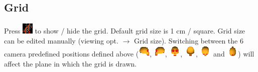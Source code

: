 \subsection{Grid}
Press \includegraphics[scale=0.7]{images/06/display/grid.png} to show / hide the grid. Default grid size is 1 cm / square. Grid size can be edited manually
(viewing opt. $\rightarrow$ Grid size).
Switching between the 6 camera predefined positions defined above (\includegraphics[scale=0.7]{images/06/camera/camera_right.png}, 
\includegraphics[scale=0.7]{images/06/camera/camera_left.png}, 
\includegraphics[scale=0.7]{images/06/camera/camera_front.png}, 
\includegraphics[scale=0.7]{images/06/camera/camera_back.png}, 
\includegraphics[scale=0.7]{images/06/camera/camera_above.png} and 
\includegraphics[scale=0.7]{images/06/camera/camera_below.png})
will affect the plane in which the grid is drawn.




